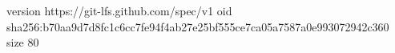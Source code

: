 version https://git-lfs.github.com/spec/v1
oid sha256:b70aa9d7d8fc1c6cc7fe94f4ab27e25bf555ce7ca05a7587a0e993072942c360
size 80
